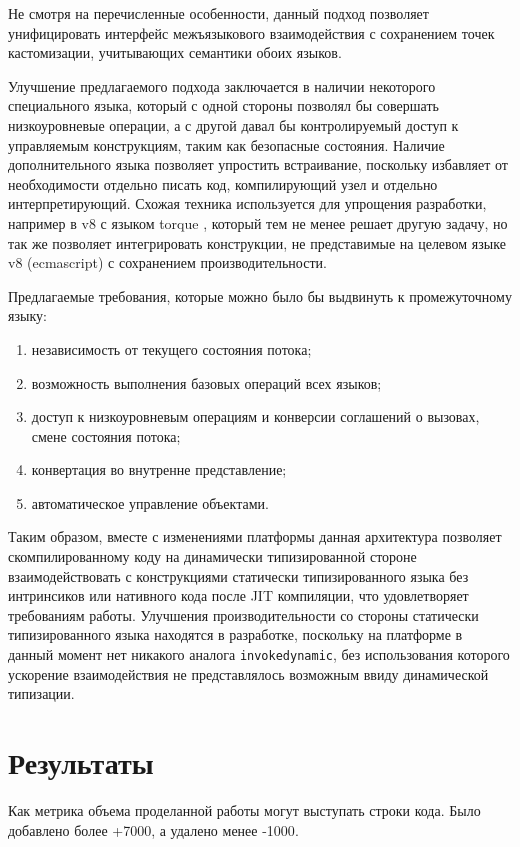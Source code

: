 \documentclass[times
,titlepage
]{itmo-student-thesis}
\begin{document}
\chapterconclusion
Не смотря на перечисленные особенности, данный подход позволяет унифицировать интерфейс межъязыкового взаимодействия с сохранением точек кастомизации, учитывающих семантики обоих языков.

Улучшение предлагаемого подхода заключается в наличии некоторого специального языка, который с одной стороны позволял бы совершать низкоуровневые операции, а с другой давал бы контролируемый доступ к управляемым конструкциям, таким как безопасные состояния. Наличие дополнительного языка позволяет упростить встраивание, поскольку избавляет от необходимости отдельно писать код, компилирующий узел и отдельно интерпретирующий. Схожая техника используется для упрощения разработки, например в v8 с языком torque \cite{torque}, который тем не менее решает другую задачу, но так же позволяет интегрировать конструкции, не представимые на целевом языке v8 (ecmascript) с сохранением производительности.

Предлагаемые требования, которые можно было бы выдвинуть к промежуточному языку:
\begin{enumerate}
	\item независимость от текущего состояния потока;
	\item возможность выполнения базовых операций всех языков;
	\item доступ к низкоуровневым операциям и конверсии соглашений о вызовах, смене состояния потока;
	\item конвертация во внутренне представление;
	\item автоматическое управление объектами.
\end{enumerate}
Таким образом, вместе с изменениями платформы данная архитектура позволяет скомпилированному коду на динамически типизированной стороне взаимодействовать с конструкциями статически типизированного языка без интринсиков или нативного кода после JIT компиляции, что удовлетворяет требованиям работы. Улучшения производительности со стороны статически типизированного языка находятся в разработке, поскольку на платформе в данный момент нет никакого аналога \texttt{invokedynamic}, без использования которого ускорение взаимодействия не представлялось возможным ввиду динамической типизации.

\chapter{Результаты}\label{ch:results}
Как метрика объема проделанной работы могут выступать строки кода. Было добавлено более {\color{green}+7000}, а удалено менее {\color{red}-1000}.
\end{document}
